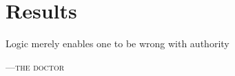 %
%

\chapter{Results}
\label{ch:results}


\epigraph{Logic merely enables one to be wrong with authority}%
{\textsc{---the doctor}} %

%

